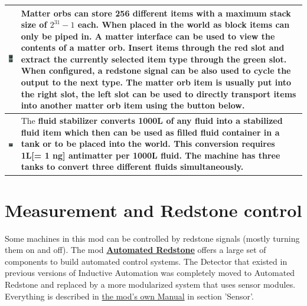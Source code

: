 \documentclass[11pt]{article} %
\makeatletter
\newcommand{\imgtex}{\begin{tabularx}{\textwidth}{@{}c@{ }X@{}}}
\makeatother
\begin{document}
\imgtex
\includegraphics[align = t]{blockMatterOrb} & \bf Matter orbs \rm can store 256 different items with a maximum stack size of $2^{31}-1$ each. When placed in the world as block items can only be piped in. A \bf matter interface \rm can be used to view the contents of a matter orb. Insert items through the red slot and extract the currently selected item type through the green slot. When configured, a redstone signal can be also used to cycle the output to the next type. The matter orb item is usually put into the right slot, the left slot can be used to directly transport items into another matter orb item using the button below.\\ \hline 
\includegraphics[align = t]{blockFluidconverter} & The \bf fluid stabilizer \rm converts 1000L of any fluid into a stabilized fluid item which then can be used as filled fluid container in a tank or to be placed into the world. This conversion requires 1L[= 1 ng] antimatter per 1000L fluid. The machine has three tanks to convert three different fluids simultaneously. \\ \hline
\end{tabularx}

\newpage
\section{Measurement and Redstone control}
Some machines in this mod can be controlled by redstone signals (mostly turning them on and off).
The mod \href{https://minecraft.curseforge.com/projects/automated-redstone}{\bf Automated Redstone\rm} offers a large set of components to build automated control systems. The Detector that existed in previous versions of Inductive Automation was completely moved to Automated Redstone and replaced by a more modularized system that uses sensor modules. Everything is described in \href{https://github.com/CD4017BE/AutomatedRedstone/blob/master-1.10.2/doc/manual/AutomatedRedstoneManual.pdf}{the mod's own Manual} in section 'Sensor'.
\end{document}
